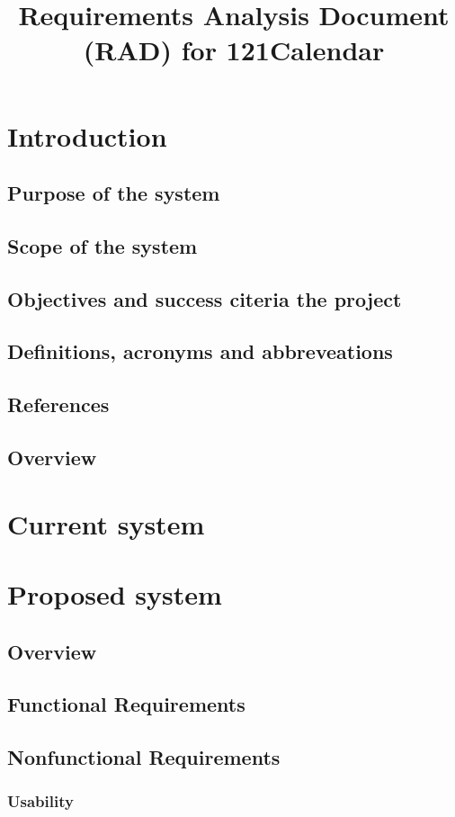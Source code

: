 \documentclass{article}
\begin{document}
\title{Requirements Analysis Document (RAD) for 121Calendar}
\tableofcontents

\section{Introduction}
	\subsection{Purpose of the system}
	\subsection{Scope of the system}
	\subsection{Objectives and success citeria the project}
	\subsection{Definitions, acronyms and abbreveations}
	\subsection{References}
	\subsection{Overview}
\section{Current system}
\section{Proposed system}
	\subsection{Overview}
	\subsection{Functional Requirements}
	\subsection{Nonfunctional Requirements}
		\subsubsection{Usability}
\end{document}
